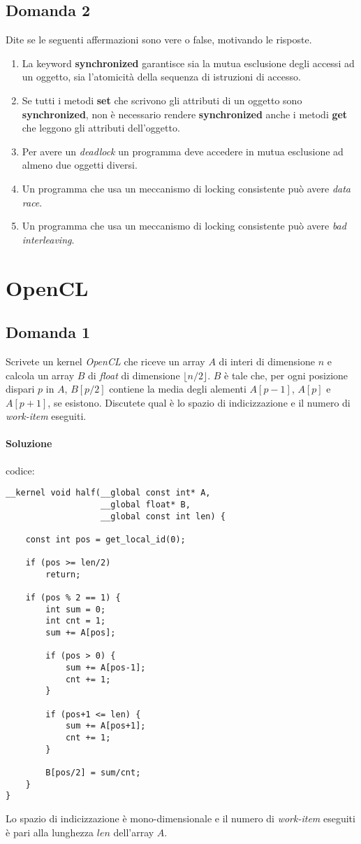 \subsection{Domanda 2}
Dite se le seguenti affermazioni sono vere o false, motivando le risposte.
\begin{enumerate}
	\item La keyword \textbf{synchronized} garantisce sia la mutua esclusione degli accessi ad un oggetto, sia l'atomicità della sequenza di istruzioni di accesso.
	\item Se tutti i metodi \textbf{set} che scrivono gli attributi di un oggetto sono \textbf{synchronized}, non è necessario rendere \textbf{synchronized} anche i metodi \textbf{get} che leggono gli attributi dell'oggetto.
	\item Per avere un \textit{deadlock} un programma deve accedere in mutua esclusione ad almeno due oggetti diversi.
	\item Un programma che usa un meccanismo di locking consistente può avere \textit{data race}.
	\item Un programma che usa un meccanismo di locking consistente può avere \textit{bad interleaving}.
\end{enumerate}

\newpage

\section{OpenCL}

\subsection{Domanda 1}
Scrivete un kernel \textit{OpenCL} che riceve un array $A$ di interi di dimensione $n$ e calcola un array $B$ di \textit{float} di dimensione $\lfloor n/2 \rfloor$. $B$ è tale che, per ogni posizione dispari $p$ in $A$, $B[p/2]$ contiene la media degli alementi $A[p-1]$, $A[p]$ e $A[p+1]$, se esistono. Discutete qual è lo spazio di indicizzazione e il numero di \textit{work-item} eseguiti.

\paragraph{Soluzione}
codice:
\begin{lstlisting}
__kernel void half(__global const int* A,
                   __global float* B,
                   __global const int len) {

	const int pos = get_local_id(0);

	if (pos >= len/2)
		return;

	if (pos % 2 == 1) {
		int sum = 0;
		int cnt = 1;
		sum += A[pos];

		if (pos > 0) {
			sum += A[pos-1];
			cnt += 1;
		}

		if (pos+1 <= len) {
			sum += A[pos+1];
			cnt += 1;
		}

		B[pos/2] = sum/cnt;
	}
}
\end{lstlisting}
Lo spazio di indicizzazione è mono-dimensionale e il numero di \textit{work-item} eseguiti è pari alla lunghezza $len$ dell'array $A$.